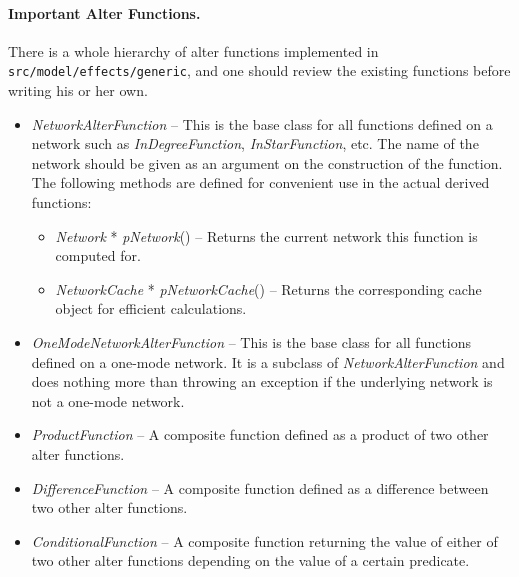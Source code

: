 \documentclass[12pt]{article}
\renewcommand{\=}{\,=\,}
\newcommand{\+}{\,+\,}
\newcommand{\nnm}[1]{\textsf{\small\textit{#1}}}
\begin{document}
\paragraph{Important Alter Functions.} There is a whole hierarchy of alter functions implemented in
\texttt{src/model/effects/generic}, and one should review the existing functions before writing
his or her own.
\begin{itemize}
\item \nnm{NetworkAlterFunction} -- This is the base class for all functions defined on a network
such as \nnm{InDegreeFunction}, \nnm{InStarFunction}, etc. The name of the network should be given
as an argument on the construction of the function. The following methods are defined for convenient
use in the actual derived functions:
\begin{itemize}
\item \nnm{Network} * \nnm{pNetwork}() -- Returns the current network this function is computed for.
\item \nnm{NetworkCache} * \nnm{pNetworkCache}() -- Returns the corresponding cache object for
efficient calculations.
\end{itemize}

\item \nnm{OneModeNetworkAlterFunction} -- This is the base class for all functions defined on a
one-mode network. It is a subclass of \nnm{NetworkAlterFunction} and does nothing more than
throwing an exception if the underlying network is not a one-mode network.

\item \nnm{ProductFunction} -- A composite function defined as a product of two other alter functions.
\item \nnm{DifferenceFunction} -- A composite function defined as a difference between two other alter functions.
\item \nnm{ConditionalFunction} -- A composite function returning the value of either of two other alter functions
depending on the value of a certain predicate.
\end{itemize}
\end{document}
